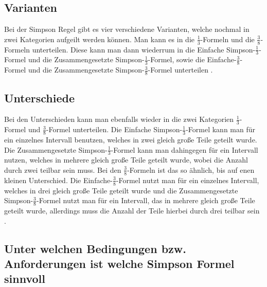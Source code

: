 \subsection{Varianten}

Bei der Simpson Regel gibt es vier verschiedene Varianten, welche nochmal in zwei Kategorien aufgeilt werden können. Man kann es in die \(\frac{1}{3}\)-Formeln und die \(\frac{3}{8}\)-Formeln unterteilen. Diese kann man dann wiederrum in die Einfache Simpson-\(\frac{1}{3}\)-Formel und die Zusammengesetzte Simpson-\(\frac{1}{3}\)-Formel, sowie die Einfache-\(\frac{3}{8}\)-Formel und die Zusammengesetzte Simpson-\(\frac{3}{8}\)-Formel unterteilen \textsc{\cite[S. 342]{SimpsonVarianten}}  \textsc{\cite[S. 327]{BasicNumMath}}.


\subsection{Unterschiede}\label{sec:Unterschiede}

Bei den Unterschieden kann man ebenfalls wieder in die zwei Kategorien \(\frac{1}{3}\)-Formel und \(\frac{3}{8}\)-Formel unterteilen. Die Einfache Simpson-\(\frac{1}{3}\)-Formel kann man für ein einzelnes Intervall benutzen, welches in zwei gleich große Teile geteilt wurde. Die Zusammengesetzte Simpson-\(\frac{1}{3}\)-Formel kann man dahingegen für ein Intervall nutzen, welches in mehrere gleich große Teile geteilt wurde, wobei die Anzahl durch zwei teilbar sein muss. Bei den \(\frac{3}{8}\)-Formeln ist das so ähnlich, bis auf enen kleinen Unterschied. Die Einfache-\(\frac{3}{8}\)-Formel nutzt man für ein einzelnes Intervall, welches in drei gleich große Teile geteilt wurde und die Zusammengesetzte Simpson-\(\frac{3}{8}\)-Formel nutzt man für ein Intervall, das in mehrere gleich große Teile geteilt wurde, allerdings muss die Anzahl der Teile hierbei durch drei teilbar sein \textsc{\cite[S. 310]{NumMathe}} \textsc{\cite[S. 180]{NumMethodsScienceEng}}.


\subsection{Unter welchen Bedingungen bzw. Anforderungen ist welche Simpson Formel sinnvoll}

